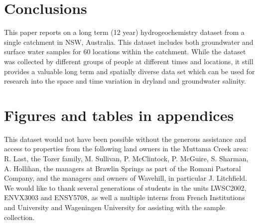 \documentclass[, manuscript]{copernicus}
\begin{document}
\section{Conclusions}

This paper reports on a long term (12 year) hydrogeochemistry dataset
from a single catchment in NSW, Australia. This dataset includes both
groundwater and surface water samples for 60 locations within the
catchment. While the dataset was collected by different groups of people
at different times and locations, it still provides a valuable long term
and spatially diverse data set which can be used for research into the
space and time variation in dryland and groundwater salinity.







\appendix
\section{Figures and tables in appendices}
\noappendix




\begin{acknowledgements}
This dataset would not have been possible without the generous
assistance and access to properties from the following land owners in
the Muttama Creek area: R. Last, the Tozer family, M. Sullivan, P.
McClintock, P. McGuire, S. Sharman, A. Hollihan, the managers at Brawlin
Springs as part of the Romani Pastoral Company, and the managers and
owners of Wavehill, in particular J. Litchfield. We would like to thank
several generations of students in the units LWSC2002, ENVX3003 and
ENSY5708, as well a multiple interns from French Institutions and
University and Wageningen University for assisting with the sample
collection.
\end{acknowledgements}
\end{document}
